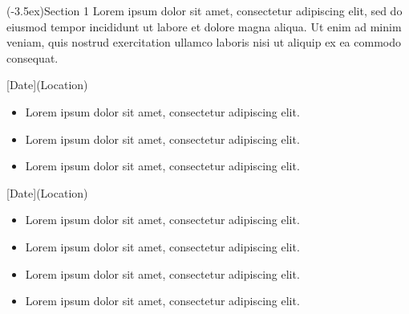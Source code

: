 \documentclass[11pt, a4paper, cvroundpic]{my-cv}
\begin{document}
  \CVHeader


  \CVSection[\faPortrait](-3.5ex){Section 1}
    Lorem ipsum dolor sit amet, consectetur adipiscing elit, sed do eiusmod tempor incididunt ut labore et dolore magna aliqua. Ut enim ad minim veniam, quis nostrud exercitation ullamco laboris nisi ut aliquip ex ea commodo consequat.

  \vspace{3mm}



    [Date](Location)
  	  \begin{itemize}
  	    \item Lorem ipsum dolor sit amet, consectetur adipiscing elit.
  	    \item Lorem ipsum dolor sit amet, consectetur adipiscing elit.
  	    \item Lorem ipsum dolor sit amet, consectetur adipiscing elit.
  	  \end{itemize}


	\CVItemDivider[0.5pt]

	\vspace{2mm}

    [Date](Location)
      \vspace{-3mm}
      \begin{multicols}{2}
  	    \begin{itemize}
  	      \item Lorem ipsum dolor sit amet, consectetur adipiscing elit.
  	  	  \item Lorem ipsum dolor sit amet, consectetur adipiscing elit.
  	  	  \item Lorem ipsum dolor sit amet, consectetur adipiscing elit.
  	  	  \item Lorem ipsum dolor sit amet, consectetur adipiscing elit.
  	    \end{itemize}
      \end{multicols}
\end{document}
